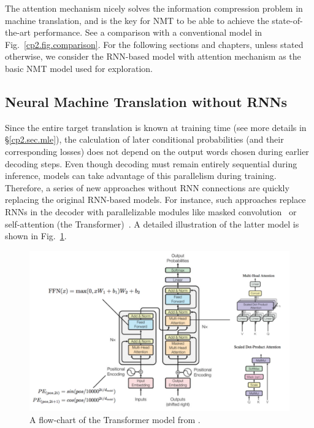 The attention mechanism nicely solves the information compression problem in machine translation, and is the key for NMT to be able to achieve the state-of-the-art performance. See a comparison with a conventional \sts model in Fig.~\ref{cp2.fig.comparison}. For the following sections and chapters, unless stated otherwise, we consider the RNN-based \sts model with attention mechanism as the basic NMT model used for exploration. 



\subsection{Neural Machine Translation without RNNs}
Since the entire target translation is known at training time (see more details in \S\ref{cp2.sec.mle}), the calculation of later conditional probabilities (and their corresponding losses) does not depend on the output words chosen during earlier decoding steps. 
Even though decoding must remain entirely sequential during inference, models can take advantage of this parallelism during training. Therefore, a series of new approaches without RNN connections are quickly replacing the original RNN-based models.
For instance, such approaches replace RNNs in the decoder with parallelizable modules like  masked convolution~\cite{kalchbrenner2016neural, gehring2017convolutional} or self-attention (the Transformer)~\cite{vaswani2017attention}. A detailed illustration of the latter model is shown in Fig.~\ref{cp2.fig.transformer}. %
\begin{figure}[hptb]
	\includegraphics[width=\linewidth]{figs/background/transformer.pdf}
	\caption{\label{cp2.fig.transformer} A flow-chart of the Transformer model  from . }
\end{figure}

